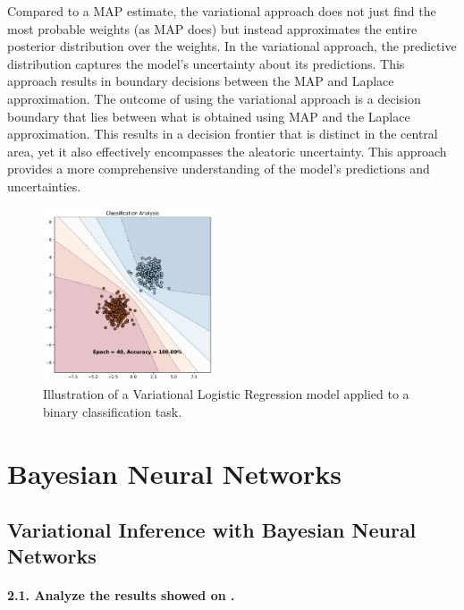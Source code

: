 Compared to a MAP estimate, the variational approach does not just find the most probable weights (as MAP does) but instead approximates the entire posterior distribution over the weights. In the variational approach, the predictive distribution captures the model's uncertainty about its predictions. This approach results in boundary decisions between the MAP and Laplace approximation. The outcome of using the variational approach is a decision boundary that lies between what is obtained using MAP and the Laplace approximation. This results in a decision frontier that is distinct in the central area, yet it also effectively encompasses the aleatoric uncertainty. This approach provides a more comprehensive understanding of the model's predictions and uncertainties. %

\begin{figure}[H]
    \centering
    \includegraphics[width=0.45\textwidth]{logreg_variational.pdf}
    \caption{Illustration of a Variational Logistic Regression model applied to a binary classification task.}
    \label{fig:logreg_variational}
\end{figure}

\section{Bayesian Neural Networks}
\subsection{Variational Inference with Bayesian Neural Networks}
\paragraph{2.1. Analyze the results showed on .}

